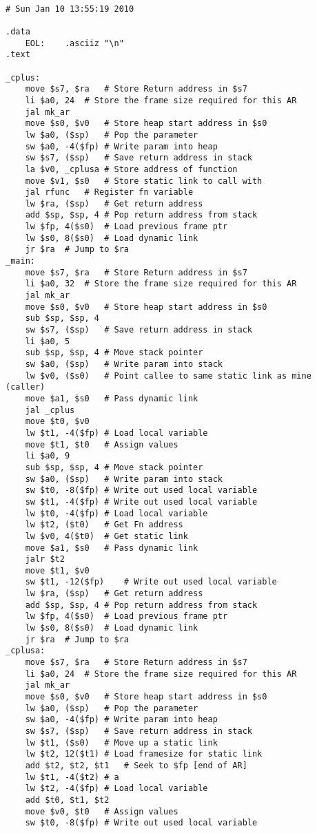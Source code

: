 \begin{lstlisting}[showstringspaces=false,breaklines=true,backgroundcolor=\color{light-gray}, captionpos=b]
         
# Sun Jan 10 13:55:19 2010

.data
	EOL:	.asciiz "\n"
.text

_cplus:
	move $s7, $ra	# Store Return address in $s7
	li $a0, 24	# Store the frame size required for this AR
	jal mk_ar
	move $s0, $v0	# Store heap start address in $s0
	lw $a0, ($sp)	# Pop the parameter
	sw $a0, -4($fp)	# Write param into heap
	sw $s7, ($sp)	# Save return address in stack
	la $v0, _cplusa	# Store address of function
	move $v1, $s0	# Store static link to call with
	jal rfunc	# Register fn variable
	lw $ra, ($sp)	# Get return address
	add $sp, $sp, 4	# Pop return address from stack
	lw $fp, 4($s0)	# Load previous frame ptr
	lw $s0, 8($s0)	# Load dynamic link
	jr $ra	# Jump to $ra
_main:
	move $s7, $ra	# Store Return address in $s7
	li $a0, 32	# Store the frame size required for this AR
	jal mk_ar
	move $s0, $v0	# Store heap start address in $s0
	sub $sp, $sp, 4
	sw $s7, ($sp)	# Save return address in stack
	li $a0, 5
	sub $sp, $sp, 4	# Move stack pointer
	sw $a0, ($sp)	# Write param into stack
	lw $v0, ($s0)	# Point callee to same static link as mine (caller)
	move $a1, $s0	# Pass dynamic link
	jal _cplus
	move $t0, $v0
	lw $t1, -4($fp)	# Load local variable
	move $t1, $t0	# Assign values
	li $a0, 9
	sub $sp, $sp, 4	# Move stack pointer
	sw $a0, ($sp)	# Write param into stack
	sw $t0, -8($fp)	# Write out used local variable
	sw $t1, -4($fp)	# Write out used local variable
	lw $t0, -4($fp)	# Load local variable
	lw $t2, ($t0)	# Get Fn address
	lw $v0, 4($t0)	# Get static link
	move $a1, $s0	# Pass dynamic link
	jalr $t2
	move $t1, $v0
	sw $t1, -12($fp)	# Write out used local variable
	lw $ra, ($sp)	# Get return address
	add $sp, $sp, 4	# Pop return address from stack
	lw $fp, 4($s0)	# Load previous frame ptr
	lw $s0, 8($s0)	# Load dynamic link
	jr $ra	# Jump to $ra
_cplusa:
	move $s7, $ra	# Store Return address in $s7
	li $a0, 24	# Store the frame size required for this AR
	jal mk_ar
	move $s0, $v0	# Store heap start address in $s0
	lw $a0, ($sp)	# Pop the parameter
	sw $a0, -4($fp)	# Write param into heap
	sw $s7, ($sp)	# Save return address in stack
	lw $t1, ($s0)	# Move up a static link
	lw $t2, 12($t1)	# Load framesize for static link
	add $t2, $t2, $t1	# Seek to $fp [end of AR]
	lw $t1, -4($t2)	# a
	lw $t2, -4($fp)	# Load local variable
	add $t0, $t1, $t2
	move $v0, $t0	# Assign values
	sw $t0, -8($fp)	# Write out used local variable

\end{lstlisting}
